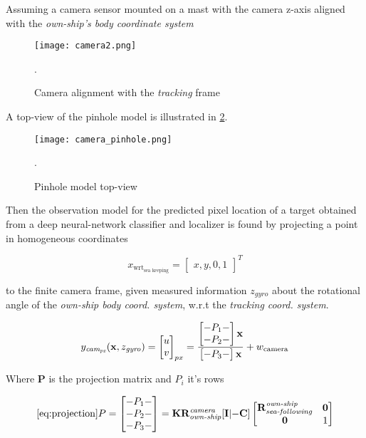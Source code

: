 Assuming a camera sensor mounted on a mast with the camera z-axis aligned with the \emph{own-ship's body coordinate system}



\begin{figure}[H]
	\centering
	\texttt{[image: camera2.png]}
	\caption{Camera alignment with the \emph{tracking} frame}.
	\label{fig:camera_alignment_tracking}
\end{figure}

A top-view of the pinhole model is illustrated in \cref{fig:camera_pinhole}.


\begin{figure}[H]
	\centering
	\texttt{[image: camera\_pinhole.png]}
	\caption{Pinhole model top-view}.
	\label{fig:camera_pinhole}
\end{figure}


Then the observation model for the predicted pixel location of a target obtained from a deep neural-network classifier and localizer is found by projecting a point in homogeneous coordinates


\begin{equation}
x_{\text{wrt}_{\text{sea keeping}}} =\begin{bmatrix}x, y, 0, 1\end{bmatrix}^T
\end{equation}


to the finite camera frame, given measured information $z_{gyro}$ about the rotational angle of the \emph{own-ship body coord. system}, w.r.t the \emph{tracking coord. system}.



\begin{equation}
{{y}}_{\textit{cam}_{\textit{px}}}(\mathbf{x},z_{\textit{gyro}}) = \begin{bmatrix}u\\v\end{bmatrix}_{px}= \frac{\begin{bmatrix}-P_1-\\-P_2-\end{bmatrix}\mathbf{x}}{
	\begin{bmatrix}
	-P_3-
	\end{bmatrix}
	\mathbf{x}}+ {w}_{\text{camera}}
\end{equation}


Where $\mathbf{P}$ is the projection matrix and $P_{i}$ it's rows

\begin{equation} \ref{eq:projection}
P = \begin{bmatrix}-P_1- \\-P_2-\\-P_3- \end{bmatrix} = \mathbf{K}\mathbf{R_{\textit{own-ship}}^{\textit{camera}}}[\mathbf{I} | \mathbf{-C}]
\begin{bmatrix}
\mathbf{\mathbf{R}_{\textit{sea-following}}^{\textit{own-ship}}} &\mathbf{0}\\
\mathbf{0} &1
\end{bmatrix}
\end{equation}

